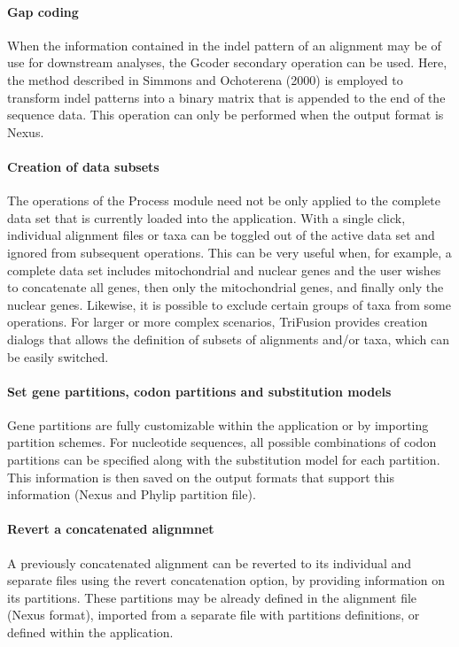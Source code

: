 \documentclass[12pt]{article}
\begin{document}
\paragraph{Gap coding}

When the information contained in the indel pattern of an alignment may be of use for downstream analyses, the Gcoder secondary operation can be used. Here, the method described in Simmons and Ochoterena (2000) is employed to transform indel patterns into a binary matrix that is appended to the end of the sequence data. This operation can only be performed when the output format is Nexus.

\paragraph{Creation of data subsets}

The operations of the Process module need not be only applied to the complete data set that is currently loaded into the application. With a single click, individual alignment files or taxa can be toggled out of the active data set and ignored from subsequent operations. This can be very useful when, for example, a complete data set includes mitochondrial and nuclear genes and the user wishes to concatenate all genes, then only the mitochondrial genes, and finally only the nuclear genes. Likewise, it is possible to exclude certain groups of taxa from some operations. For larger or more complex scenarios, TriFusion provides creation dialogs that allows the definition of subsets of alignments and/or taxa, which can be easily switched.

\paragraph{Set gene partitions, codon partitions and substitution models}

Gene partitions are fully customizable within the application or by importing partition schemes. For nucleotide sequences, all possible combinations of codon partitions can be specified along with the substitution model for each partition. This information is then saved on the output formats that support this information (Nexus and Phylip partition file).

\paragraph{Revert a concatenated alignmnet}

A previously concatenated alignment can be reverted to its individual and separate files using the revert concatenation option, by providing information on its partitions. These partitions may be already defined in the alignment file (Nexus format), imported from a separate file with partitions definitions, or defined within the application.
\end{document}
